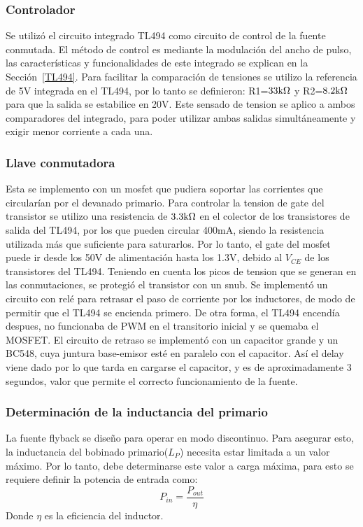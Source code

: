 \subsubsection{Controlador}
\medskip
Se utilizó el circuito integrado TL494 como circuito de control de la fuente conmutada. El método de control es mediante la modulación del ancho de pulso, las características y funcionalidades de este integrado se explican en la Sección~\ref{TL494}. Para facilitar la comparación de tensiones se utilizo la referencia de 5V integrada en el TL494, por lo tanto se definieron: R1=$33\mbox{k}\Omega $ y R2=$8.2\mbox{k}\Omega$ para que la salida se estabilice en 20V. Este sensado de tension se aplico a ambos comparadores del integrado, para poder utilizar ambas salidas simultáneamente y exigir menor corriente a cada una.
\medskip
\subsubsection{Llave conmutadora}
\medskip
Esta se implemento con un mosfet que pudiera soportar las corrientes que circularían por el devanado primario. Para controlar la tension de gate del transistor se utilizo una resistencia de $3.3\mbox{k}\Omega$ en el colector de los transistores de salida del TL494, por los que pueden circular 400mA, siendo la resistencia utilizada más que suficiente para saturarlos. Por lo tanto, el gate del mosfet puede ir desde los 50V de alimentación hasta los 1.3V, debido al $V_{CE}$ de los transistores del TL494. Teniendo en cuenta los picos de tension que se generan en las conmutaciones, se protegió el transistor con un snub.
Se implementó un circuito con relé para retrasar el paso de corriente por los inductores, de modo de permitir que el TL494 se encienda primero. De otra forma, el TL494 encendía despues, no funcionaba de PWM en el transitorio inicial y se quemaba el MOSFET. El circuito de retraso se implementó con un capacitor grande y un BC548, cuya juntura base-emisor esté en paralelo con el capacitor. Así el delay viene dado por lo que tarda en cargarse el capacitor, y es de aproximadamente 3 segundos, valor que permite el correcto funcionamiento de la fuente. 

\medskip
\subsubsection{Determinación de la inductancia del primario}
\medskip
La fuente flyback se diseño para operar en modo discontinuo. Para asegurar esto, la 
inductancia del bobinado primario($L_P$) necesita estar limitada a un valor máximo.
Por lo tanto, debe determinarse este valor a carga máxima, para esto se requiere definir la
potencia de entrada como:
$$
P_{in}= \frac{P_{out}}{\eta}
$$
Donde $\eta$ es la eficiencia del inductor.

